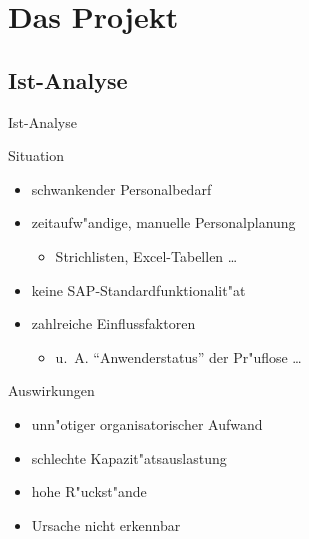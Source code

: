 \section{Das Projekt}
\subsection{Ist-Analyse}
\begin{frame}[<+->]{Ist-Analyse}
	\begin{block}{Situation}
		\begin{itemize}[<+->]
			\item schwankender Personalbedarf
			\item {zeitaufw"andige, manuelle Personalplanung 
				\begin{itemize}
					\item Strichlisten, Excel-Tabellen \ldots
				\end{itemize}
			}
			\item {keine SAP-Standardfunktionalit"at}
			\item {zahlreiche Einflussfaktoren
				\begin{itemize}
					\item u.~A. "`Anwenderstatus"' der Pr"uflose \ldots
				\end{itemize}
			}
		\end{itemize}
	\end{block}
	\begin{block}{Auswirkungen}
		\begin{itemize}[<+->]
			\item unn"otiger organisatorischer Aufwand
			\item schlechte Kapazit"atsauslastung
			\item hohe R"uckst"ande
			\item Ursache nicht erkennbar
		\end{itemize}
	\end{block}

\end{frame}

